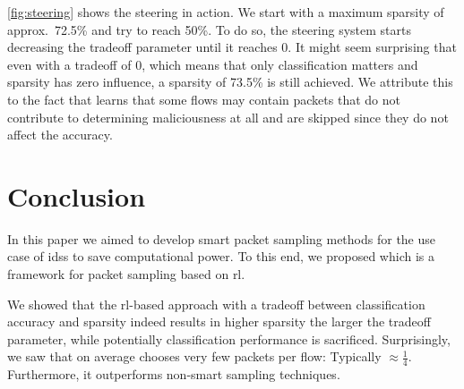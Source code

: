 \documentclass[conference]{IEEEtran}
\begin{document}

\autoref{fig:steering} shows the steering in action. We start with a maximum sparsity of approx.~72.5\% and try to reach 50\%. To do so, the steering system starts decreasing the tradeoff parameter until it reaches 0. It might seem surprising that even with a tradeoff of 0, which means that only classification matters and sparsity has zero influence, a sparsity of 73.5\% is still achieved. We attribute this to the fact that \ours{} learns that some flows may contain packets that do not contribute to determining maliciousness at all and are skipped since they do not affect the accuracy. %


\section{Conclusion}
\label{sec:conclusion}
In this paper we aimed to develop smart packet sampling methods for the use case of \glspl{ids} to save computational power. To this end, we proposed \ours{} which is a framework for packet sampling based on \gls{rl}.

We showed that the \gls{rl}-based approach with a tradeoff between classification accuracy and sparsity indeed results in higher sparsity the larger the tradeoff parameter, while potentially classification performance is sacrificed. Surprisingly, we saw that \ours{} on average chooses very few packets per flow: Typically $\approx \frac{1}{4}$. Furthermore, it outperforms non-smart sampling techniques.
\end{document}
